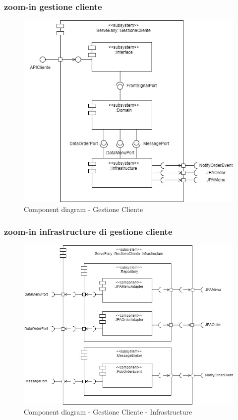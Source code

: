 \subsubsection{zoom-in gestione cliente}
\begin{figure}[H]
	\centering
	\includegraphics[scale=0.5]{iterazione1/images/GestioneCliente_subsystem-GestioneCliente.jpg}
	\caption{Component diagram - Gestione Cliente \label{fig:component_diagram_gestione_cliente}}
\end{figure}

\subsubsection{zoom-in infrastructure di gestione cliente}
\begin{figure}[H]
	\centering
	\includegraphics[scale=0.5]{iterazione1/images/GestioneCliente_subsystem-Infrastructure.jpg}
	\caption{Component diagram - Gestione Cliente - Infrastructure \label{fig:component_diagram_gestione_cliente_infrastructure}}
\end{figure}

